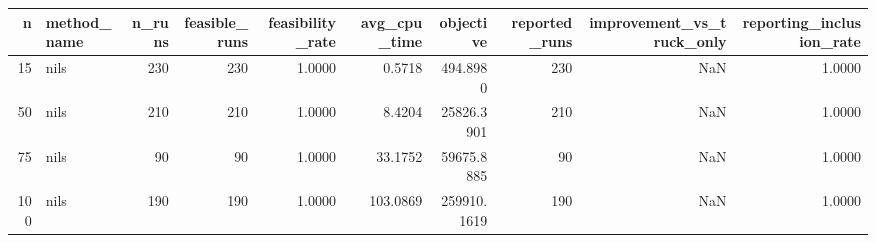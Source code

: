 \begin{tabular}{rlrrrrrrrr}
\toprule
n & method_name & n_runs & feasible_runs & feasibility_rate & avg_cpu_time & objective & reported_runs & improvement_vs_truck_only & reporting_inclusion_rate \\
\midrule
15 & nils & 230 & 230 & 1.0000 & 0.5718 & 494.8980 & 230 & NaN & 1.0000 \\
50 & nils & 210 & 210 & 1.0000 & 8.4204 & 25826.3901 & 210 & NaN & 1.0000 \\
75 & nils & 90 & 90 & 1.0000 & 33.1752 & 59675.8885 & 90 & NaN & 1.0000 \\
100 & nils & 190 & 190 & 1.0000 & 103.0869 & 259910.1619 & 190 & NaN & 1.0000 \\
\bottomrule
\end{tabular}
